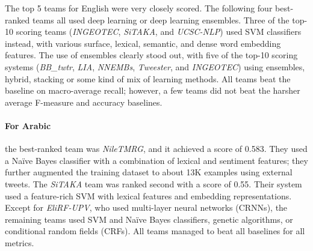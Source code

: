 \documentclass[11pt,a4paper]{article}
\begin{document}
The top 5 teams for English were very closely scored. The following four best-ranked teams all used deep learning or deep learning ensembles. %
Three of the top-10 scoring teams (\emph{INGEOTEC}, \emph{SiTAKA}, and \emph{UCSC-NLP}) used SVM classifiers instead, with various surface, lexical, semantic, and dense word embedding features. The use of ensembles clearly stood out, with five of the top-10 scoring systems (\emph{BB\_twtr}, \emph{LIA}, \emph{NNEMBs}, \emph{Tweester}, and \emph{INGEOTEC}) using ensembles, hybrid, stacking or some kind of mix of learning methods. All teams beat the baseline on macro-average recall; however, a few teams did not beat the harsher average F-measure and accuracy baselines.

\paragraph{For Arabic} the best-ranked team was \emph{NileTMRG}, and it achieved a score of 0.583. They used a Na\"{i}ve Bayes classifier with a combination of lexical and sentiment features; they further augmented the training dataset to about 13K examples using external tweets. 
The \emph{SiTAKA} team was ranked second with a score of 0.55. Their system used a feature-rich SVM with lexical features and embedding representations.
Except for \emph{EliRF-UPV}, who used multi-layer neural networks (CRNNs), the remaining teams used SVM and Na\"{i}ve Bayes classifiers, genetic algorithms, or conditional random fields (CRFs). All teams managed to beat all baselines for all metrics.
\end{document}

